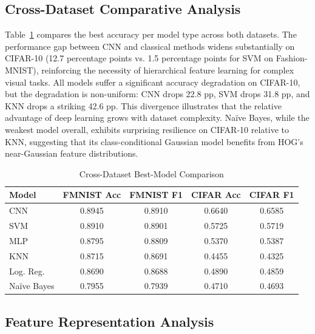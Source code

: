 \documentclass[conference]{IEEEtran}
\begin{document}
\subsection{Cross-Dataset Comparative Analysis}

Table~\ref{tab:crossdataset} compares the best accuracy per model type across both datasets. The performance gap between CNN and classical methods widens substantially on CIFAR-10 (12.7 percentage points vs. 1.5 percentage points for SVM on Fashion-MNIST), reinforcing the necessity of hierarchical feature learning for complex visual tasks. All models suffer a significant accuracy degradation on CIFAR-10, but the degradation is non-uniform: CNN drops 22.8 pp, SVM drops 31.8 pp, and KNN drops a striking 42.6 pp. This divergence illustrates that the relative advantage of deep learning grows with dataset complexity. Naïve Bayes, while the weakest model overall, exhibits surprising resilience on CIFAR-10 relative to KNN, suggesting that its class-conditional Gaussian model benefits from HOG's near-Gaussian feature distributions.

\begin{table}[h]
\centering
\caption{Cross-Dataset Best-Model Comparison}
\label{tab:crossdataset}
\renewcommand{\arraystretch}{1.2}
\begin{tabular}{lcccc}
\toprule
\textbf{Model} & \textbf{FMNIST Acc} & \textbf{FMNIST F1} & \textbf{CIFAR Acc} & \textbf{CIFAR F1} \\
\midrule
CNN         & 0.8945 & 0.8910 & 0.6640 & 0.6585 \\
SVM         & 0.8910 & 0.8901 & 0.5725 & 0.5719 \\
MLP         & 0.8795 & 0.8809 & 0.5370 & 0.5387 \\
KNN         & 0.8715 & 0.8691 & 0.4455 & 0.4325 \\
Log. Reg.   & 0.8690 & 0.8688 & 0.4890 & 0.4859 \\
Naïve Bayes & 0.7955 & 0.7939 & 0.4710 & 0.4693 \\
\bottomrule
\end{tabular}
\end{table}

\subsection{Feature Representation Analysis}
\end{document}
